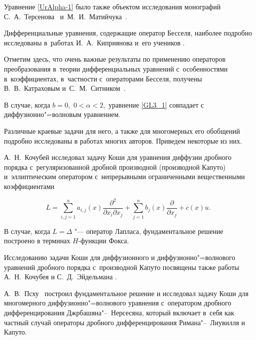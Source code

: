 Уравнение \eqref{UrAlpha-1} было также объектом исследования  монографий С.~А.~Терсенова~\cite{Tersenov} и~М.~И.~Матийчука~\cite{Matiychuk}.



Дифференциальные уравнения, содержащие оператор Бесселя, наиболее подробно исследованы в~работах И.~А.~Киприянова и~его учеников \cite{Kipriyanov-Monographiya,  Kipriyanov}.

Отметим здесь, что очень важные результаты по применению операторов преобразования в~теории дифференциальных уравнений с~особенностями в~коэффициентах, в~частности с~операторами Бесселя, получены В.~В.~Катраховым и~С.~М.~Ситником~\cite{KatrakhovSitnik, Sitnik}.





В случае, когда $b=0,$ $0<\alpha<2,$ уравнение \eqref{GL3_1} совпадает с диффузионно"=волновым уравнением. 

Различные краевые задачи для него, а также для многомерных его обобщений подробно исследованы в работах многих авторов.  Приведем некоторые из них. 



А.~Н.~Кочубей \cite{Kochubei_2} исследовал задачу Коши для уравнения диффузии дробного порядка с~регуляризованной дробной производной (производной Капуто) и~эллиптическим оператором с~непрерывными ограниченными вещественными коэффициентами

$$

L=\sum\limits_{i,j=1}^{n}a_{i,j}(x)\frac{\partial^2}{\partial x_i \partial x_j}+

\sum\limits_{j=1}^{n}b_{j}(x)\frac{\partial}{\partial x_j}+c(x) u.

$$

В случае, когда $L=\Delta$ "--- оператор Лапласа, фундаментальное решение построено в терминах $H$-функции Фокса. 

Исследованию задачи Коши для диффузионного и диффузионно"=волнового уравнений дробного порядка с~производной Капуто  посвящены также  работы А.~Н.~Кочубея и С.~Д.~Эйдельмана \cite{Kochubei_1, Kochubei_3, Kochubei_4, Kochubei_5}.



А.~В.~Псху~\cite{Pskhu2} построил фундаментальное решение и исследовал задачу Коши  для многомерного диффузионно"=волнового уравнения с~оператором дробного дифференцирования Джрбашяна"--~Нерсесяна, который  включает в~себя как частный случай операторы дробного дифференцирования Римана"--~Лиувилля и Капуто.



